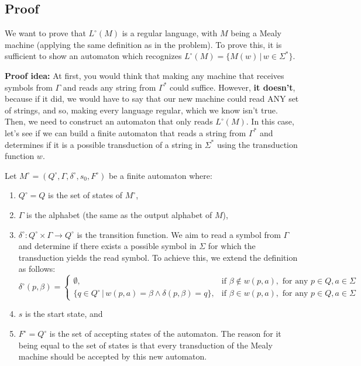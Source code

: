 \documentclass[12pt]{article}
\begin{document}
\subsection{Proof}

We want to prove that \(L^{\circ}(M)\) is a regular language, with \(M\) being a Mealy machine (applying the same definition as in the problem). To prove this, it is sufficient to show an automaton which recognizes \(L^{\circ}(M) = \{M(w) \, | \, w \in \Sigma^*\}\).

\textbf{Proof idea:}
At first, you would think that making any machine that receives symbols from \(\Gamma\) and reads any string from \(\Gamma^*\) could suffice. However,\textbf{ it doesn't}, because if it did, we would have to say that our new machine could read ANY set of strings, and so, making every language regular, which we know isn't true. Then, we need to construct an automaton that only reads \(L^{\circ}(M)\). In this case, let's see if we can build a finite automaton that reads a string from \(\Gamma^*\) and determines if it is a possible transduction of a string in \(\Sigma^*\) using the transduction function \(w\).

Let \(M^{\circ} = (Q^{\circ}, \Gamma, \delta^{\circ}, s_0, F^{\circ})\) be a finite automaton where:
\begin{enumerate}
    \item \(Q^{\circ} = Q\) is the set of states of \(M^{\circ}\),
    \item \(\Gamma\) is the alphabet (the same as the output alphabet of \(M\)),
    \item \(\delta^{\circ} : Q^{\circ} \times \Gamma \rightarrow Q^{\circ}\) is the transition function. We aim to read a symbol from \(\Gamma\) and determine if there exists a possible symbol in \(\Sigma\) for which the transduction yields the read symbol. To achieve this, we extend the definition as follows:
    \[
\delta^{\circ}(p, \beta) =
\begin{cases}
\emptyset, & \text{if } \beta \notin w(p, a), \text{ for any } p \in Q, a \in \Sigma \\
\{q \in Q^{\circ} \, | \, w(p, a) = \beta \land \delta(p, \beta) = q\}, & \text{if } \beta \in w(p, a), \text{ for any } p \in Q, a \in \Sigma
\end{cases}
\]

    \item \(s\) is the start state, and 
    \item \(F^{\circ} = Q^{\circ}\) is the set of accepting states of the automaton. The reason for it being equal to the set of states is that every transduction of the Mealy machine should be accepted by this new automaton.
\end{enumerate}
\end{document}
